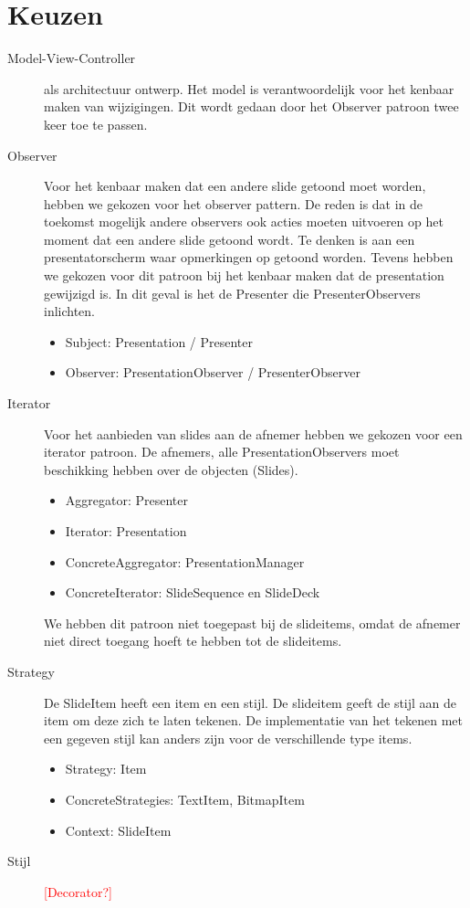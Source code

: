 \documentclass[a4paper]{article}
\newcommand{\todo}[1]{\textcolor{red}{[#1]}}
\begin{document}
\section{Keuzen}
\begin{description}
\item[Model-View-Controller] als architectuur ontwerp. Het model is verantwoordelijk voor het kenbaar maken van wijzigingen. Dit wordt gedaan door het Observer patroon twee keer toe te passen.
\item[Observer] Voor het kenbaar maken dat een andere slide getoond moet worden, hebben we gekozen voor het observer pattern. De reden is dat in de toekomst mogelijk andere observers ook acties moeten uitvoeren op het moment dat een andere slide getoond wordt. Te denken is aan een presentatorscherm waar opmerkingen op getoond worden. Tevens hebben we gekozen voor dit patroon bij het kenbaar maken dat de presentation gewijzigd is. In dit geval is het de Presenter die PresenterObservers inlichten.
\begin{itemize}
\item Subject: Presentation / Presenter
\item Observer: PresentationObserver / PresenterObserver
\end{itemize}
\item[Iterator] Voor het aanbieden van slides aan de afnemer hebben we gekozen voor een iterator patroon. De afnemers, alle PresentationObservers moet beschikking hebben over de objecten (Slides).
\begin{itemize}
\item Aggregator: Presenter
\item Iterator: Presentation
\item ConcreteAggregator: PresentationManager
\item ConcreteIterator: SlideSequence en SlideDeck
\end{itemize}
We hebben dit patroon niet toegepast bij de slideitems, omdat de afnemer niet direct toegang hoeft te hebben tot de slideitems.

\item[Strategy] De SlideItem heeft een item en een stijl. De slideitem geeft de stijl aan de item om deze zich te laten tekenen. De implementatie van het tekenen met een gegeven stijl kan anders zijn voor de verschillende type items.
\begin{itemize}
\item Strategy: Item
\item ConcreteStrategies: TextItem, BitmapItem
\item Context: SlideItem
\end{itemize}

\item[Stijl] \todo{Decorator?}
\end{description}
\end{document}
